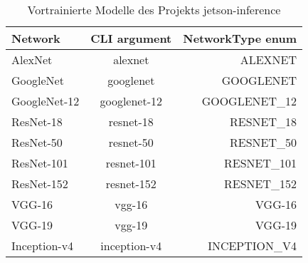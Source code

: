{\begin{table}
  \centering
  \begin{tabular}[h]{lcr}
    \textbf{Network}              & \textbf{CLI argument} & \textbf{NetworkType enum} \\ \hline
    AlexNet\index{AlexNet}        & alexnet               & ALEXNET \\
    GoogleNet\index{GoogleNet}    & googlenet             & GOOGLENET \\
    GoogleNet-12                  & googlenet-12          & GOOGLENET\_12 \\
    ResNet-18\index{ResNets}      & resnet-18             & RESNET\_18 \\
    ResNet-50                     & resnet-50             & RESNET\_50 \\
    ResNet-101                    & resnet-101            & RESNET\_101 \\
    ResNet-152                    & resnet-152            & RESNET\_152 \\
    VGG-16\index{VGG}             & vgg-16                & VGG-16 \\
    VGG-19                        & vgg-19                & VGG-19 \\
    Inception-v4\index{Inception} & inception-v4          & INCEPTION\_V4 \\
  \end{tabular}
  \caption{Vortrainierte Modelle des Projekts jetson-inference}\label{Database:TrainedModell}
\end{table}







%


}
